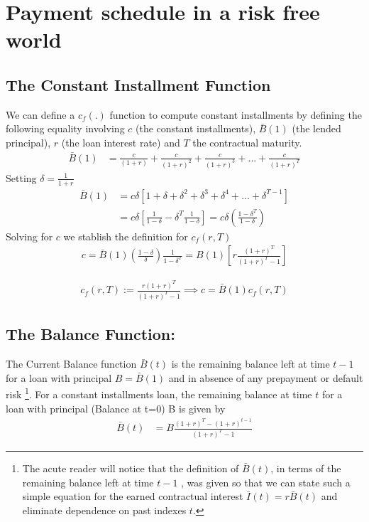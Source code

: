 \section{Payment schedule in a risk free world}
\subsection{The Constant Installment Function}
We can define a $c_f(.)$ function to compute constant installments by defining the following equality involving $c$ (the constant installments), $\bar{B}(1)$ (the lended principal), $r$ (the loan interest rate) and $T$ the contractual maturity.
\begin{align}
    \bar{B}(1) &= \frac{c}{(1+r)}+\frac{c}{(1+r)^2}+\frac{c}{(1+r)^3}+...+\frac{c}{(1+r)^T}
\end{align}
Setting $\delta=\frac{1}{1+r}$
\begin{align}
    \bar{B}(1) &=c\delta[1+\delta+\delta^2+\delta^3+\delta^4+...+\delta^{T-1}] \nonumber \\
    &=c\delta\left[\frac{1}{1-\delta}-\delta^T\frac{1}{1-\delta}\right] =c\delta\left(\frac{1-\delta^T}{1-\delta}\right)
\end{align}
Solving for $c$ we stablish the definition for $c_f(r,T)$
\begin{align}
    c=\bar{B}(1)\left(\frac{1-\delta}{\delta}\right)\frac{1}{1-\delta^T}=B(1)\left[r\frac{(1+r)^T}{(1+r)^T-1}\right]
\end{align}

\begin{align}
    \boxed{c_f(r,T):=\frac{r(1+r)^T}{(1+r)^T-1}} \implies c=\bar{B}(1)c_f(r,T) \label{eq:c}
\end{align}
\subsection{The Balance Function: }
The Current Balance function $\bar{B}(t)$ is the remaining balance left at time $t-1$ for a loan with principal $B=\bar{B}(1)$ and in absence of any prepayment or default risk \footnote{The acute reader will notice that the definition of $\bar{B}(t)$, in terms of the remaining balance left at time $t-1$ , was given so that we can state such a simple equation for the earned contractual interest $\bar{I}(t)=r\bar{B}(t)$ and eliminate dependence on past indexes $t$.}. For a constant installments loan, the remaining balance at time $t$ for a loan with principal (Balance at t=0) B is given by 
\begin{align}
\bar{B}(t)&=B\frac{(1+r)^T-(1+r)^{t-1}}{(1+r)^T-1} \label{eq:bbar1}
\end{align}

